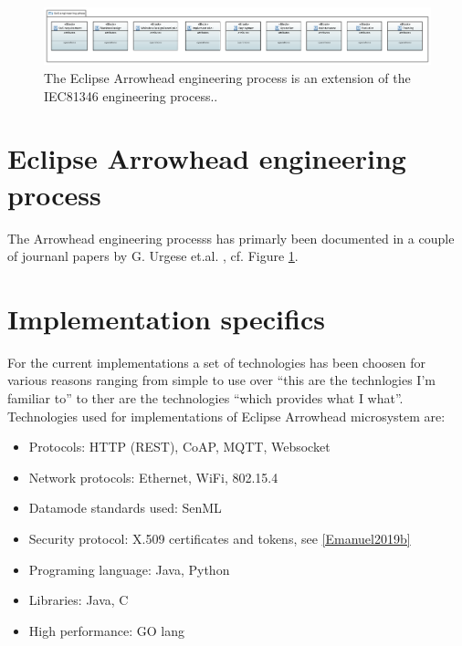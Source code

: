 \documentclass[a4paper]{arrowhead}
\begin{document}
\begin{figure}[ht!]
   \centering
   \includegraphics[width=0.9\linewidth]{figures/ArrowheadEngineeringProcess}
   \caption{The Eclipse Arrowhead engineering process is an extension
     of the IEC81346 engineering process..}
   \label{fig:engineering_process}
 \end{figure}


\section{Eclipse Arrowhead engineering process}
The Arrowhead engineering processs has primarly been documented in a
couple of journanl papers by G. Urgese
et.al. \cite{Urgese2019,Urgese2021}, cf. Figure \ref{fig:engineering_process}. 

\section{Implementation specifics}
For the current implementations a set of technologies has been choosen
for various reasons ranging from simple to use over ``this are the
technlogies I'm familiar to'' to ther are the technologies ``which
provides what I what''. Technologies used for implementations of
Eclipse Arrowhead microsystem are:

\begin{itemize}      
    \item Protocols: HTTP (REST), CoAP, MQTT, Websocket
    \item Network protocols: Ethernet, WiFi, 802.15.4
    \item Datamode standards used: SenML
    \item Security protocol: X.509 certificates and tokens, see \ref{Emanuel2019b}
    \item Programing language: Java, Python
    \item Libraries: Java, C
    \item High performance: GO lang
\end{itemize}  
 









\newpage
\end{document}
